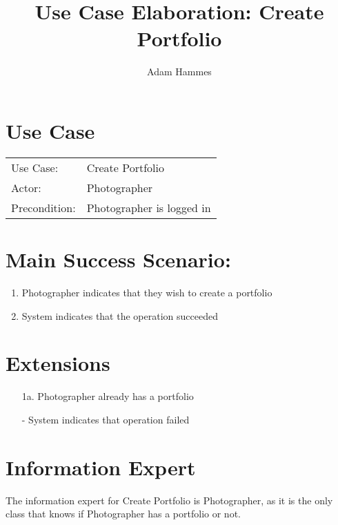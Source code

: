 \documentclass{article}
\title{Use Case Elaboration: Create Portfolio}
\author{ Adam Hammes }
\begin{document}
\maketitle


\section*{Use Case}
\begin{tabular}{l l}
Use Case:     & Create Portfolio\\
Actor:        & Photographer \\
Precondition: & Photographer is logged in\\
\end{tabular}


\section*{Main Success Scenario:}

\begin{enumerate}
    \item Photographer indicates that they wish to create a portfolio
    \item System indicates that the operation succeeded

\end{enumerate}

\section*{Extensions}

\begin{itemize}
    \item [1a.] Photographer already has a portfolio
    
    - System indicates that operation failed
\end{itemize}


\section*{Information Expert}

The information expert for Create Portfolio is Photographer, as it is the only class that knows if Photographer has a portfolio or not.
\end{document}
